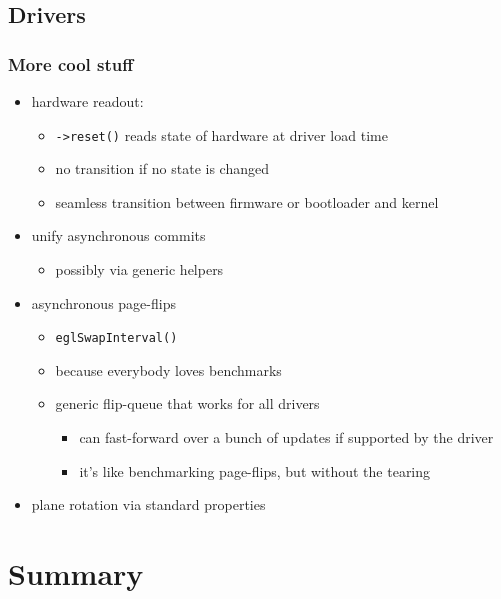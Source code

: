\documentclass[t]{beamer}
\begin{document}
\subsection{Drivers}

\begin{frame}
	\frametitle{More cool stuff}
	\begin{itemize}
		\item hardware readout:
			\begin{itemize}
				\item {\tt ->reset()} reads state of hardware at driver load
					time
				\item no transition if no state is changed
				\item seamless transition between firmware or bootloader and
					kernel
			\end{itemize}
		\item unify asynchronous commits
			\begin{itemize}
				\item possibly via generic helpers
			\end{itemize}
		\item asynchronous page-flips
			\begin{itemize}
				\item {\tt eglSwapInterval()}
				\item because everybody loves benchmarks
				\item generic flip-queue that works for all drivers
					\begin{itemize}
						\item can fast-forward over a bunch of updates if
							supported by the driver
						\item it's like benchmarking page-flips, but without
							the tearing
					\end{itemize}
			\end{itemize}
		\item plane rotation via standard properties
	\end{itemize}
\end{frame}

\section{Summary}
\end{document}
